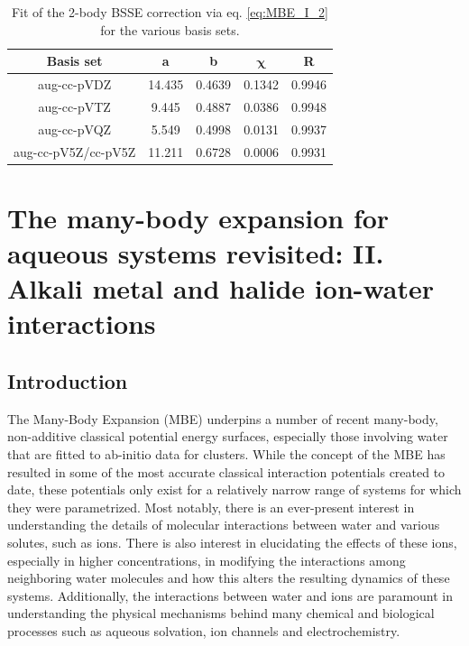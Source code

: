 \documentclass[11pt, proquest]{uwthesis}[2020/02/24]
\begin{document}
\begin{table}[]
\centering
\begin{tabular}{@{}ccccc@{}}
\toprule
\textbf{Basis set}  & \textbf{a} & \textbf{b} & $\mathbf{\chi}$ & \textbf{R} \\
\hline
aug-cc-pVDZ         & 14.435 & 0.4639 & 0.1342 & 0.9946 \\
aug-cc-pVTZ         & 9.445  & 0.4887 & 0.0386 & 0.9948 \\
aug-cc-pVQZ         & 5.549  & 0.4998 & 0.0131 & 0.9937 \\
aug-cc-pV5Z/cc-pV5Z & 11.211 & 0.6728 & 0.0006 & 0.9931 \\ \bottomrule
\end{tabular}
\caption[Fit of the 2-body BSSE correction via eq. \eqref{eq:MBE_I_2} for the various basis sets.]{Fit of the 2-body BSSE correction via eq. \eqref{eq:MBE_I_2} for the various basis sets.}
\label{tab:MBE_I_T6}
\end{table}

\chapter{The many-body expansion for aqueous systems revisited: II. Alkali metal and halide ion-water interactions}

\section{Introduction}
\par The Many-Body Expansion (MBE) underpins a number of recent many-body, non-additive classical potential energy surfaces, especially those involving water\autocite{burnham_development_2002,fanourgakis_flexible_2006,fanourgakis_development_2008,heindel_benchmark_2018,wang_flexible_2011,babin_development_2013,das_development_2019,gora_predictions_2014} that are fitted to ab-initio data for clusters. While the concept of the MBE has resulted in some of the most accurate classical interaction potentials created to date, these potentials only exist for a relatively narrow range of systems for which they were parametrized. Most notably, there is an ever-present interest in understanding the details of molecular interactions between water and various solutes, such as ions. There is also interest in elucidating the effects of these ions, especially in higher concentrations, in modifying the interactions among neighboring water molecules and how this alters the resulting dynamics of these systems. Additionally, the interactions between water and ions are paramount in understanding the physical mechanisms behind many chemical and biological processes such as aqueous solvation\autocite{makarov_solvation_2002,collins_ions_2004}, ion channels\autocite{pinto_influenza_1992,shearman_modulation_1989} and electrochemistry.\autocite{zhang_effects_2011,liu_doping_2006,tang_dynamic_2011}
\end{document}
